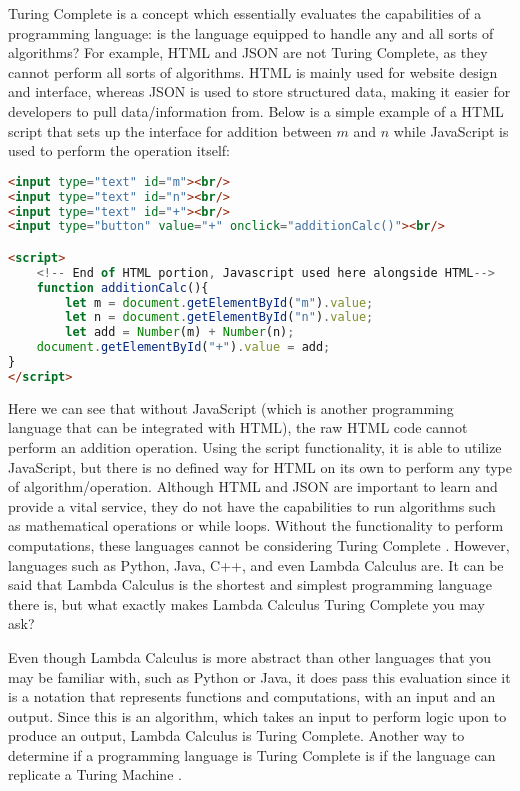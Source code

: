 \documentclass{article}
\begin{document}
\medskip\noindent
 Turing Complete is a concept which essentially evaluates the capabilities of a programming language: is the language equipped to handle any and all sorts of algorithms? For example, HTML and JSON are not Turing Complete, as they cannot perform all sorts of algorithms. HTML is mainly used for website design and interface, whereas JSON is used to store structured data, making it easier for developers to pull data/information from. Below is a simple example of a HTML script that sets up the interface for addition between $m$ and $n$ while JavaScript is used to perform the operation itself:
 
 \begin{lstlisting}[language=html] 
<input type="text" id="m"><br/>
<input type="text" id="n"><br/>
<input type="text" id="+"><br/>
<input type="button" value="+" onclick="additionCalc()"><br/>

<script>
    <!-- End of HTML portion, Javascript used here alongside HTML-->
    function additionCalc(){
        let m = document.getElementById("m").value;
        let n = document.getElementById("n").value;
        let add = Number(m) + Number(n);
    document.getElementById("+").value = add;
}
</script>
\end{lstlisting}
 
 \medskip\noindent
 Here we can see that without JavaScript (which is another programming language that can be integrated with HTML), the raw HTML code cannot perform an addition operation. Using the script functionality, it is able to utilize JavaScript, but there is no defined way for HTML on its own to perform any type of algorithm/operation. Although HTML and JSON are important to learn and provide a vital service, they do not have the capabilities to run algorithms such as mathematical operations or while loops. Without the functionality to perform computations, these languages cannot be considering  Turing Complete \cite{TC}. However, languages such as Python, Java, C++, and even Lambda Calculus are. It can be said that Lambda Calculus is the shortest and simplest programming language there is, but what exactly makes Lambda Calculus Turing Complete you may ask? 

\medskip\noindent
Even though Lambda Calculus is more abstract than other languages that you may be familiar with, such as Python or Java, it does pass this evaluation since it is a notation that represents functions and computations, with an input and an output. Since this is an algorithm, which takes an input to perform logic upon to produce an output, Lambda Calculus is Turing Complete. Another way to determine if a programming language is Turing Complete is if the language can replicate a Turing Machine \cite{Turing Completeness}.
\end{document}

